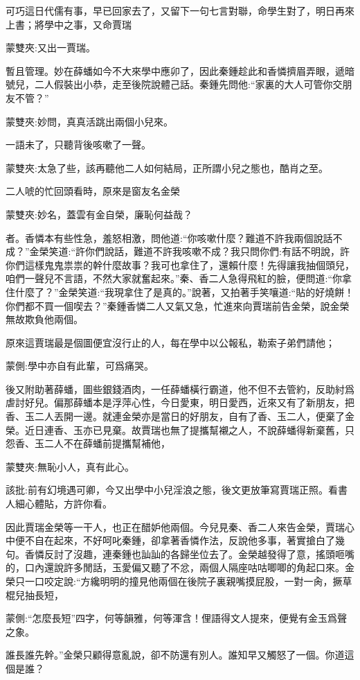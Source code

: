 \begin{parag}
    可巧這日代儒有事，早已回家去了，又留下一句七言對聯，命學生對了，明日再來上書；將學中之事，又命賈瑞\begin{note}蒙雙夾:又出一賈瑞。\end{note}暫且管理。妙在薛蟠如今不大來學中應卯了，因此秦鍾趁此和香憐擠眉弄眼，遞暗號兒，二人假裝出小恭，走至後院說體己話。秦鍾先問他:“家裏的大人可管你交朋友不管？”\begin{note}蒙雙夾:妙問，真真活跳出兩個小兒來。\end{note}一語未了，只聽背後咳嗽了一聲。\begin{note}蒙雙夾:太急了些，該再聽他二人如何結局，正所謂小兒之態也，酷肖之至。\end{note}二人唬的忙回頭看時，原來是窗友名金榮\begin{note}蒙雙夾:妙名，蓋雲有金自榮，廉恥何益哉？\end{note}者。香憐本有些性急，羞怒相激，問他道:“你咳嗽什麼？難道不許我兩個說話不成？”金榮笑道:“許你們說話，難道不許我咳嗽不成？我只問你們:有話不明說，許你們這樣鬼鬼祟祟的幹什麼故事？我可也拿住了，還賴什麼！先得讓我抽個頭兒，咱們一聲兒不言語，不然大家就奮起來。”秦、香二人急得飛紅的臉，便問道:“你拿住什麼了？”金榮笑道:“我現拿住了是真的。”說著，又拍著手笑嚷道:“貼的好燒餅！你們都不買一個喫去？”秦鍾香憐二人又氣又急，忙進來向賈瑞前告金榮，說金榮無故欺負他兩個。
\end{parag}


\begin{parag}
    原來這賈瑞最是個圖便宜沒行止的人，每在學中以公報私，勒索子弟們請他；\begin{note}蒙側:學中亦自有此輩，可爲痛哭。\end{note}後又附助著薛蟠，圖些銀錢酒肉，一任薛蟠橫行霸道，他不但不去管約，反助紂爲虐討好兒。偏那薛蟠本是浮萍心性，今日愛東，明日愛西，近來又有了新朋友，把香、玉二人丟開一邊。就連金榮亦是當日的好朋友，自有了香、玉二人，便棄了金榮。近日連香、玉亦已見棄。故賈瑞也無了提攜幫襯之人，不說薛蟠得新棄舊，只怨香、玉二人不在薛蟠前提攜幫補他，\begin{note}蒙雙夾:無恥小人，真有此心。\end{note}\begin{note}該批:前有幻境遇可卿，今又出學中小兒淫浪之態，後文更放筆寫賈瑞正照。看書人細心體貼，方許你看。\end{note}因此賈瑞金榮等一干人，也正在醋妒他兩個。今兒見秦、香二人來告金榮，賈瑞心中便不自在起來，不好呵叱秦鍾，卻拿著香憐作法，反說他多事，著實搶白了幾句。香憐反討了沒趣，連秦鍾也訕訕的各歸坐位去了。金榮越發得了意，搖頭咂嘴的，口內還說許多閒話，玉愛偏又聽了不忿，兩個人隔座咕咕唧唧的角起口來。金榮只一口咬定說:“方纔明明的撞見他兩個在後院子裏親嘴摸屁股，一對一肏，撅草棍兒抽長短，\begin{note}蒙側:“怎麼長短”四字，何等韻雅，何等渾含！俚語得文人提來，便覺有金玉爲聲之象。\end{note}誰長誰先幹。”金榮只顧得意亂說，卻不防還有別人。誰知早又觸怒了一個。你道這個是誰？
\end{parag}


